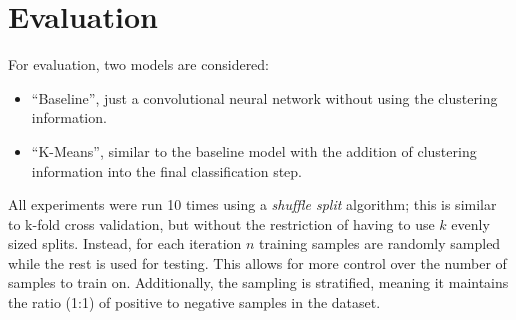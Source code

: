 \section{Evaluation}
\FloatBarrier%

For evaluation, two models are considered:
\begin{itemize}
  \item ``Baseline'', just a convolutional neural network without using the
    clustering information.
  \item ``K-Means'', similar to the baseline model with the addition of
    clustering information into the final classification step.
\end{itemize}
All experiments were run 10 times using a \emph{shuffle split} algorithm; this
is similar to k-fold cross validation, but without the restriction of having to
use $k$ evenly sized splits. Instead, for each iteration $n$ training samples
are randomly sampled while the rest is used for testing. This allows for more
control over the number of samples to train on. Additionally, the sampling is
stratified, meaning it maintains the ratio (1:1) of positive to negative samples
in the dataset.

